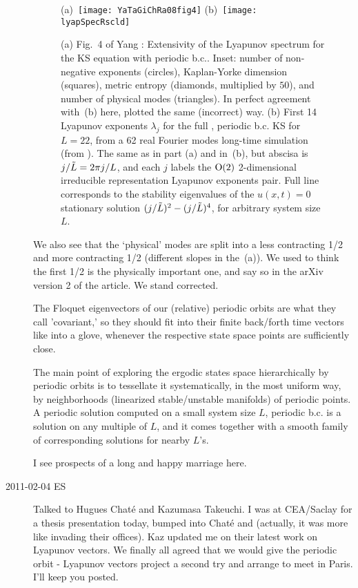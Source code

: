 \begin{description}
\begin{figure}
 (a)~\texttt{[image: YaTaGiChRa08fig4]}
 (b)~\texttt{[image: lyapSpecRscld]}
\caption{
(a)
Fig.~4 of
Yang \etal{}:
Extensivity of the Lyapunov spectrum for the KS equation with
periodic b.c.. Inset: number of non-negative exponents (circles),
Kaplan-Yorke dimension (squares), metric entropy (diamonds,
multiplied by $50$), and number of physical modes (triangles).
In perfect agreement with
\,(b) here, plotted the same
(incorrect) way.
(b)
First 14 Lyapunov exponents $\lambda_j$ for the full
\statesp, periodic b.c. KS for $L=22$, from a 62 real Fourier
modes long-time simulation (from ).
The same as in part (a) and in \,(b), but
abscisa is $j/\tilde{L} = 2 \pi j/L$, and each $j$ labels
the $\textrm{O}(2)$ 2-dimensional irreducible representation
Lyapunov exponents pair.  Full line corresponds to
the stability eigenvalues
of the $u(x,t)=0$ stationary solution
$(j/\tilde{L})^2- (j/\tilde{L})^4$, for arbitrary system size $L$.
}
\label{fig:lyapSpecRscld}
\end{figure}


We also see
that the `physical' modes are split into a less contracting 1/2
and more contracting 1/2 (different slopes in the
\,(a)). We
used to think the first 1/2 is the physically important one,
and say so in the arXiv version 2 of the article.
We stand corrected.

The Floquet eigenvectors of our (relative) periodic orbits are
what they call 'covariant,' so they should fit into their finite back/forth
time vectors like into a glove, whenever the respective state space
points are sufficiently close.

The main point of exploring the ergodic states space hierarchically
by periodic orbits is to tessellate it systematically, in the most
uniform way, by neighborhoods (linearized stable/unstable manifolds)
of periodic points. A periodic solution computed on a small system
size $L$, periodic b.c. is a solution on any multiple of $L$, and it comes
together with a smooth family of corresponding solutions for nearby
$L$'s.

I see prospects of a long and happy marriage here.

\item[2011-02-04 ES] Talked to Hugues Chat\'{e} and Kazumasa Takeuchi.
I was at CEA/Saclay for a thesis presentation today, bumped into Chat\'{e}
and
(actually, it was more like invading their offices). Kaz updated me on
their latest work on Lyapunov vectors. We finally all agreed that we would give
the periodic orbit - Lyapunov vectors project a second try and arrange to meet
in Paris. I'll keep you posted.



\end{description}
